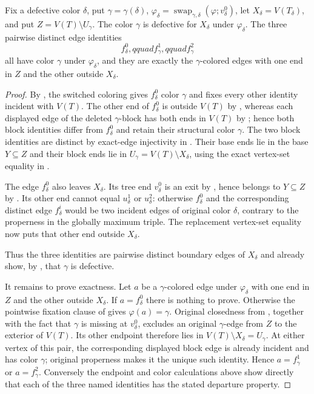 \begin{helper}
Fix a defective color $\delta$, put
$\gamma=\gamma(\delta)$,
$\varphi_\delta=\operatorname{swap}_{\gamma,\delta}
 (\varphi;v^0_\delta)$, let
$X_\delta=V(T_\delta)$, and put
$Z=V(T)\setminus U_\gamma$.  The color $\gamma$ is defective for
$X_\delta$ under $\varphi_\delta$.  The three pairwise distinct edge
identities
\[
 f^0_\delta,qquad f^1_\gamma,qquad f^2_\gamma
\]
all have color $\gamma$ under $\varphi_\delta$, and they are exactly the
$\gamma$-colored edges with one end in $Z$ and the other outside
$X_\delta$.
\end{helper}
\begin{proof}
By , the switched coloring gives
$f^0_\delta$ color $\gamma$ and fixes every other identity incident with
$V(T)$.  The other end of $f^0_\delta$ is outside $V(T)$ by
, whereas each displayed edge of the
deleted $\gamma$-block has both ends in $V(T)$ by
; hence both block identities
differ from $f^0_\delta$ and retain their structural color $\gamma$.
The two block identities are distinct by exact-edge injectivity in
.  Their base ends lie in the
base $Y\subseteq Z$ and their block ends lie in
$U_\gamma=V(T)\setminus X_\delta$, using the exact vertex-set equality in
.

The edge $f^0_\delta$ also leaves $X_\delta$.  Its tree end
$v^0_\delta$ is an exit by , hence belongs
to $Y\subseteq Z$ by .  Its other
end cannot equal $u^1_\delta$ or $u^2_\delta$: otherwise
$f^0_\delta$ and the corresponding distinct edge $f^i_\delta$ would be
two incident edges of original color $\delta$, contrary to the properness
in the globally maximum triple.  The replacement vertex-set equality now
puts that other end outside $X_\delta$.

Thus the three identities are pairwise distinct boundary edges of
$X_\delta$ and already show, by , that
$\gamma$ is defective.

It remains to prove exactness.  Let $a$ be a $\gamma$-colored edge under
$\varphi_\delta$ with one end in $Z$ and the other outside $X_\delta$.
If $a=f^0_\delta$ there is nothing to prove.  Otherwise the pointwise
fixation clause of  gives
$\varphi(a)=\gamma$.  Original closedness from
, together with the fact that
$\gamma$ is missing at $v^0_\delta$, excludes an original
$\gamma$-edge from $Z$ to the exterior of $V(T)$.  Its other endpoint
therefore lies in $V(T)\setminus X_\delta=U_\gamma$.  At either vertex
of this pair, the corresponding displayed block edge is already incident
and has color $\gamma$; original properness makes it the unique such
identity.  Hence $a=f^1_\gamma$ or $a=f^2_\gamma$.  Conversely the
endpoint and color calculations above show directly that each of the
three named identities has the stated departure property.
\end{proof}
